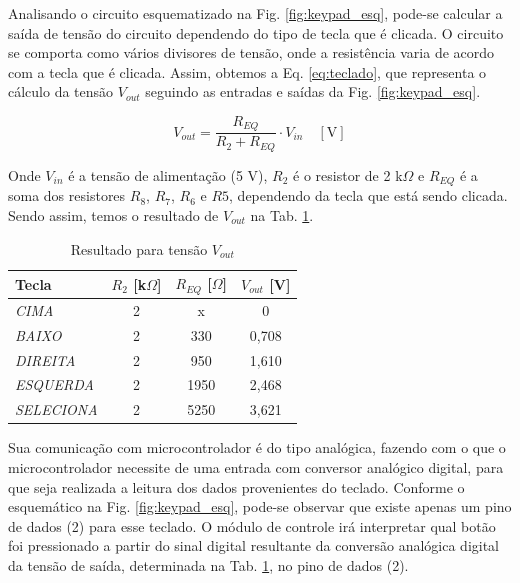         Analisando o circuito esquematizado na Fig. \ref{fig:keypad_esq}, pode-se calcular a saída de tensão do circuito dependendo do tipo de tecla que é clicada. O circuito se comporta como vários divisores de tensão, onde a resistência varia de acordo com a tecla que é clicada. Assim, obtemos a Eq. \ref{eq:teclado}, que representa o cálculo da tensão $V_{out}$ seguindo as entradas e saídas da Fig. \ref{fig:keypad_esq}.
        
        \begin{equation}\label{eq:teclado}
            V_{out} = \frac{R_{EQ}}{R_2 + R_{EQ}} \cdot V_{in} \quad [\text{V}]
        \end{equation}
        
        Onde $V_{in}$ é a tensão de alimentação (5 V), $R_2$ é o resistor de 2 k$\Omega$ e $R_{EQ}$ é a soma dos resistores $R_8$, $R_7$, $R_6$ e $R5$, dependendo da tecla que está sendo clicada. Sendo assim, temos o resultado de $V_{out}$ na Tab. \ref{tab:teclado}.
        
        \begin{table}[!htb]
        \centering
        \caption{Resultado para tensão $V_{out}$}
        \label{tab:teclado}
        \begin{adjustbox}{max width = \textwidth}
            \begin{tabular}{|l|c|c|c|}
                \hline
                \rowcolor[HTML]{A8DADC}
                \textbf{Tecla} & $R_2$ [k$\Omega$] & $R_{EQ}$ [$\Omega$] & $V_{out}$ [V] \\ \hline
                \textit{CIMA} & 2 & x & 0 \\ \hline
                \textit{BAIXO} & 2 & 330  & 0,708 \\ \hline
                \textit{DIREITA} & 2 & 950 & 1,610 \\ \hline
                \textit{ESQUERDA} & 2 & 1950 & 2,468 \\ \hline
                \textit{SELECIONA} & 2 & 5250 & 3,621 \\ \hline
            \end{tabular}
        \end{adjustbox}
        \end{table}
            
        Sua comunicação com microcontrolador é do tipo analógica, fazendo com o que o microcontrolador necessite de uma entrada com conversor analógico digital, para que seja realizada a leitura dos dados provenientes do teclado. 
        Conforme o esquemático na Fig. \ref{fig:keypad_esq}, pode-se observar que existe apenas um pino de dados (2) para esse teclado. O módulo de controle irá interpretar qual botão foi pressionado a partir do sinal digital resultante da conversão analógica digital da tensão de saída, determinada na Tab. \ref{tab:teclado}, no pino de dados (2). 
    
